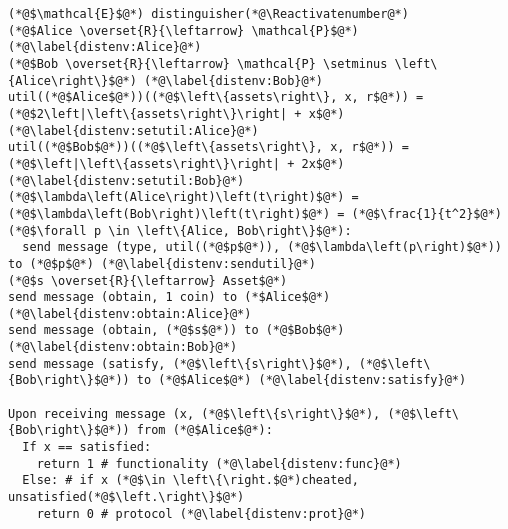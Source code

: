 \Suppressnumber
\begin{lstlisting}[label=distenv, style=numbers]
(*@$\mathcal{E}$@*) distinguisher(*@\Reactivatenumber@*)
(*@$Alice \overset{R}{\leftarrow} \mathcal{P}$@*) (*@\label{distenv:Alice}@*)
(*@$Bob \overset{R}{\leftarrow} \mathcal{P} \setminus \left\{Alice\right\}$@*) (*@\label{distenv:Bob}@*)
util((*@$Alice$@*))((*@$\left\{assets\right\}, x, r$@*)) = (*@$2\left|\left\{assets\right\}\right| + x$@*) (*@\label{distenv:setutil:Alice}@*)
util((*@$Bob$@*))((*@$\left\{assets\right\}, x, r$@*)) = (*@$\left|\left\{assets\right\}\right| + 2x$@*) (*@\label{distenv:setutil:Bob}@*)
(*@$\lambda\left(Alice\right)\left(t\right)$@*) = (*@$\lambda\left(Bob\right)\left(t\right)$@*) = (*@$\frac{1}{t^2}$@*)
(*@$\forall p \in \left\{Alice, Bob\right\}$@*):
  send message (type, util((*@$p$@*)), (*@$\lambda\left(p\right)$@*)) to (*@$p$@*) (*@\label{distenv:sendutil}@*)
(*@$s \overset{R}{\leftarrow} Asset$@*)
send message (obtain, 1 coin) to (*$Alice$@*) (*@\label{distenv:obtain:Alice}@*)
send message (obtain, (*@$s$@*)) to (*@$Bob$@*) (*@\label{distenv:obtain:Bob}@*)
send message (satisfy, (*@$\left\{s\right\}$@*), (*@$\left\{Bob\right\}$@*)) to (*@$Alice$@*) (*@\label{distenv:satisfy}@*)

Upon receiving message (x, (*@$\left\{s\right\}$@*), (*@$\left\{Bob\right\}$@*)) from (*@$Alice$@*):
  If x == satisfied:
    return 1 # functionality (*@\label{distenv:func}@*)
  Else: # if x (*@$\in \left\{\right.$@*)cheated, unsatisfied(*@$\left.\right\}$@*)
    return 0 # protocol (*@\label{distenv:prot}@*)
\end{lstlisting}
